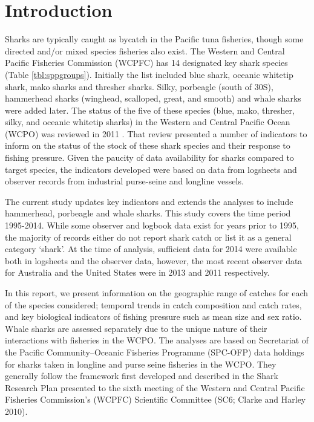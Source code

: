 \documentclass[12pt]{SCreport}
\begin{document}






\newpage
\section{Introduction} %


Sharks are typically caught as bycatch in the Pacific tuna fisheries, though some directed and/or mixed species fisheries also exist. The Western and Central Pacific Fisheries Commission (WCPFC) has 14 designated key shark species (Table \ref{tbl:sppgroups}). Initially the list included blue shark, oceanic whitetip shark, mako sharks and thresher sharks. Silky, porbeagle (south of 30\degree{}S), hammerhead sharks (winghead, scalloped, great, and smooth) and whale sharks were added later.  The status of the five of these species (blue, mako, thresher, silky, and oceanic whitetip sharks) in the Western and Central Pacific Ocean (WCPO) was reviewed in 2011 \citep{Clarke2011_a, Clarke2011_b}. That review presented a number of indicators to inform on the status of the stock of these shark species and their response to fishing pressure. Given the paucity of data availability for sharks compared to target species, the indicators developed were based on data from logsheets and observer records from industrial purse-seine and longline vessels.

The current study updates key indicators and extends the analyses to include hammerhead, porbeagle and whale sharks. This study covers the time period 1995-2014. While some observer and logbook data exist for years prior to 1995, the majority of records either do not report shark catch or list it as a general category ‘shark’. At the time of analysis, sufficient data for 2014 were available both in logsheets and the observer data, however, the most recent observer data for Australia and the United States were in 2013 and 2011 respectively. 
 
In this report, we present information on the geographic range of catches for each of the species considered; temporal trends in catch composition and catch rates, and key biological indicators of fishing pressure such as mean size and sex ratio. Whale sharks are assessed separately due to the unique nature of their interactions with fisheries in the WCPO. The analyses are based on Secretariat of the Pacific Community--Oceanic Fisheries Programme (SPC-OFP) data holdings for sharks taken in longline and purse seine fisheries in the WCPO.  They generally follow the framework first developed and described in the Shark Research Plan presented to the sixth meeting of the Western and Central Pacific Fisheries Commission's (WCPFC) Scientific Committee (SC6; Clarke and Harley 2010). 
\end{document}

